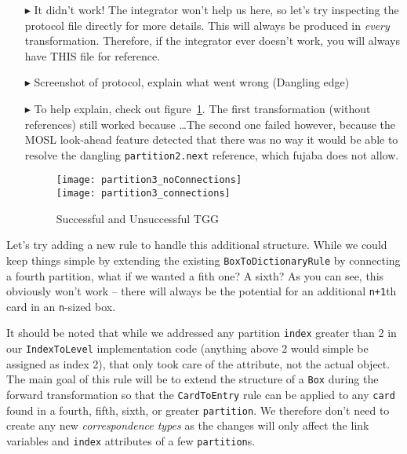\begin{itemize}
\item[$\blacktriangleright$] It didn't work! The integrator won't help us here, so let's try inspecting the protocol file directly for more details. This will
always be produced in \emph{every} transformation. Therefore, if the integrator ever doesn't work, you will always have THIS file for reference.

\item[$\blacktriangleright$] Screenshot of protocol, explain what went wrong (Dangling edge)

\item[$\blacktriangleright$] To help explain, check out figure~\ref{fig:partition3comparison}. The first transformation (without references) still worked
because \ldots The second one failed however, because the MOSL look-ahead feature detected that there was no way it would be able to resolve the dangling
\texttt{partition2.next} reference, which fujaba does not allow.

\newpage

\begin{figure}[htbp]
 	\centering
   \texttt{[image: partition3\_noConnections]}
   \\ \vspace{1cm}
    \texttt{[image: partition3\_connections]}
 	\caption{Successful and Unsuccessful TGG}
 	\label{fig:partition3comparison}
\end{figure}
\FloatBarrier

\end{itemize}

Let's try adding a new rule to handle this additional structure. While we could keep things simple by extending the existing
\texttt{BoxToDictionaryRule} by connecting a fourth partition, what if we wanted a fith one? A sixth? As you can see, this obviously won't work -- there will
always be the potential for an additional \texttt{n+1}th card in an \texttt{n}-sized box.

It should be noted that while we addressed any partition \texttt{index} greater than 2 in our \texttt{IndexToLevel} implementation
code (anything above 2 would simple be assigned as index 2), that only took care of the attribute, not the actual object. The main goal of this rule will be to
extend the structure of a \texttt{Box} during the forward transformation so that the \texttt{CardToEntry} rule
can be applied to any \texttt{card} found in a fourth, fifth, sixth, or greater \texttt{partition}. We therefore don't need to create any new \emph{correspondence
types}  as the changes will only affect the link variables and \texttt{index} attributes of a few \texttt{partition}s.






% 
